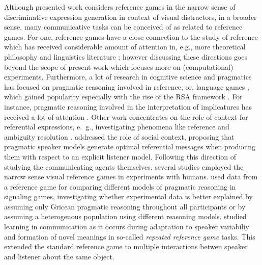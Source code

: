 Although presented work considers reference games in the narrow sense of discriminative expression generation in context of visual distractors, in a broader sense, many communicative tasks can be conceived of as related to reference games. 
For one, reference games have a close connection to the study of reference which has received considerable amount of attention in, e.g., more theoretical philosophy and linguistics literature \parencite[e.~g., ][]{searle1969speech, krifka2008basic, sep-reference}; however discussing these directions goes beyond the scope of present work which focuses more on (computational) experiments. 
Furthermore, a lot of research in cognitive science and pragmatics has focused on pragmatic reasoning involved in reference, or, language games \parencite[e.~g.,][]{frank2012predicting, wittgenstein2010philosophical}, which gained popularity especially with the rise of the RSA framework \parencite{goodman2016pragmatic}.  
For instance, pragmatic reasoning involved in the interpretation of implicatures has received a lot of attention \parencite[e.~g.,][]{bergen2016pragmatic, rothschild2013game, van2012explaining}.
Other work concentrates on the role of context for referential expressions, e.~g., investigating phenomena like reference and ambiguity resolution \parencite{frank2016rational, potts2016embedded}. \cite{golland2010game} addressed the role of social context, proposing that pragmatic speaker models generate optimal referential messages when producing them with respect to an explicit listener model. 
Following this direction of studying the communicating agents themselves, several studies employed the narrow sense visual reference games in experiments with humans. \cite{franke2016reasoning} used data from a reference game for comparing different models of pragmatic reasoning in signaling games, investigating whether experimental data is better explained by assuming only Gricean pragmatic reasoning throughout all participants or by assuming a heterogenous population using different reasoning models. %
\cite{hawkins2020characterizing} studied learning in communication as it occurs during adaptation to speaker variabiliy and formation of novel meanings in so-called \emph{repeated reference game} tasks. This extended the standard reference game to multiple interactions betwen speaker and listener about the same object. 

